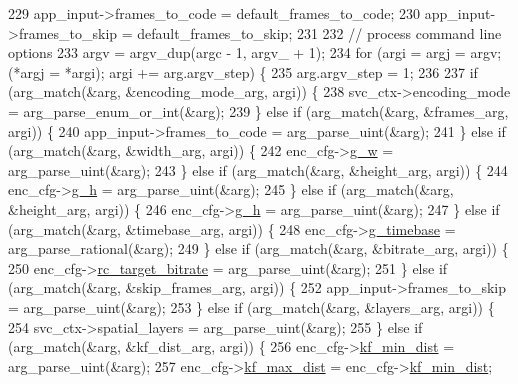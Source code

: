 \begin{DoxyCodeInclude}
{{{{229   app\_input->frames\_to\_code = default\_frames\_to\_code;
230   app\_input->frames\_to\_skip = default\_frames\_to\_skip;
231 
232   \textcolor{comment}{// process command line options}
233   argv = argv\_dup(argc - 1, argv\_ + 1);
234   \textcolor{keywordflow}{for} (argi = argj = argv; (*argj = *argi); argi += arg.argv\_step) \{
235     arg.argv\_step = 1;
236 
237     \textcolor{keywordflow}{if} (arg\_match(&arg, &encoding\_mode\_arg, argi)) \{
238       svc\_ctx->encoding\_mode = arg\_parse\_enum\_or\_int(&arg);
239     \} \textcolor{keywordflow}{else} \textcolor{keywordflow}{if} (arg\_match(&arg, &frames\_arg, argi)) \{
240       app\_input->frames\_to\_code = arg\_parse\_uint(&arg);
241     \} \textcolor{keywordflow}{else} \textcolor{keywordflow}{if} (arg\_match(&arg, &width\_arg, argi)) \{
242       enc\_cfg->\hyperlink{structvpx__codec__enc__cfg_a5c165f5b41ca1158f2883983a2b7709c}{g\_w} = arg\_parse\_uint(&arg);
243     \} \textcolor{keywordflow}{else} \textcolor{keywordflow}{if} (arg\_match(&arg, &height\_arg, argi)) \{
244       enc\_cfg->\hyperlink{structvpx__codec__enc__cfg_a4132bd89ce85bce7c08f2cc3b6f2b82e}{g\_h} = arg\_parse\_uint(&arg);
245     \} \textcolor{keywordflow}{else} \textcolor{keywordflow}{if} (arg\_match(&arg, &height\_arg, argi)) \{
246       enc\_cfg->\hyperlink{structvpx__codec__enc__cfg_a4132bd89ce85bce7c08f2cc3b6f2b82e}{g\_h} = arg\_parse\_uint(&arg);
247     \} \textcolor{keywordflow}{else} \textcolor{keywordflow}{if} (arg\_match(&arg, &timebase\_arg, argi)) \{
248       enc\_cfg->\hyperlink{structvpx__codec__enc__cfg_a6498d378e4c29ef3e22258289e481087}{g\_timebase} = arg\_parse\_rational(&arg);
249     \} \textcolor{keywordflow}{else} \textcolor{keywordflow}{if} (arg\_match(&arg, &bitrate\_arg, argi)) \{
250       enc\_cfg->\hyperlink{structvpx__codec__enc__cfg_ab8339685175d66710f482706cc9f0aed}{rc\_target\_bitrate} = arg\_parse\_uint(&arg);
251     \} \textcolor{keywordflow}{else} \textcolor{keywordflow}{if} (arg\_match(&arg, &skip\_frames\_arg, argi)) \{
252       app\_input->frames\_to\_skip = arg\_parse\_uint(&arg);
253     \} \textcolor{keywordflow}{else} \textcolor{keywordflow}{if} (arg\_match(&arg, &layers\_arg, argi)) \{
254       svc\_ctx->spatial\_layers = arg\_parse\_uint(&arg);
255     \} \textcolor{keywordflow}{else} \textcolor{keywordflow}{if} (arg\_match(&arg, &kf\_dist\_arg, argi)) \{
256       enc\_cfg->\hyperlink{structvpx__codec__enc__cfg_a0a7b5444ecb09745cbe8d5af17553846}{kf\_min\_dist} = arg\_parse\_uint(&arg);
257       enc\_cfg->\hyperlink{structvpx__codec__enc__cfg_ae018440136e271743376730413d25a9b}{kf\_max\_dist} = enc\_cfg->\hyperlink{structvpx__codec__enc__cfg_a0a7b5444ecb09745cbe8d5af17553846}{kf\_min\_dist};
}}}}
\end{DoxyCodeInclude}
